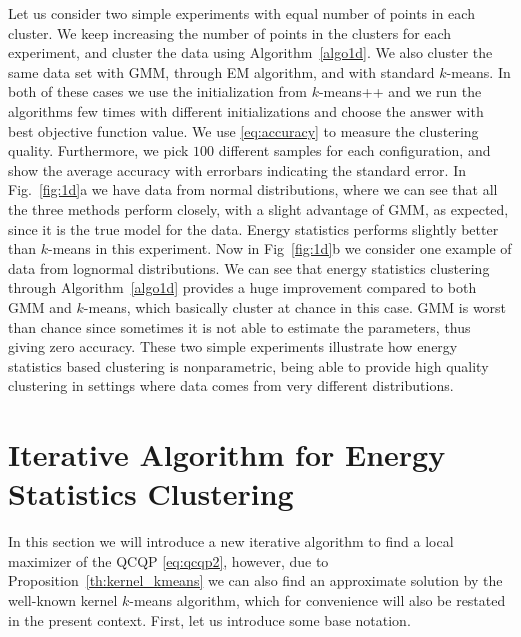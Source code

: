 \documentclass[aps,preprint,nofootinbib,floatfix]{revtex4-1}
\begin{document}
Let us consider two simple experiments with equal number of points
in each cluster. 
We keep increasing the number of points in the clusters for each experiment, 
and cluster the data using Algorithm~\ref{algo1d}. 
We also cluster the same data set
with GMM, through EM algorithm, and with standard $k$-means. In both of these
cases we use the initialization from $k$-means++ \cite{Vassilvitskii} 
and we run the algorithms
few times with different initializations and choose the answer
with best objective function value. We use \eqref{eq:accuracy} to measure
the clustering quality. Furthermore, we pick $100$ different samples
for each configuration, and show the average accuracy with errorbars indicating
the standard error.
In  Fig.~\ref{fig:1d}a 
we have data from normal distributions,
where we can see that all the three methods
perform closely, with a slight advantage of GMM, as expected, since
it is the true model for the data. Energy statistics performs slightly better
than $k$-means in this experiment. Now in Fig~\ref{fig:1d}b
we consider one example of 
data from lognormal distributions. We can see that energy
statistics clustering through Algorithm~\ref{algo1d} provides a huge 
improvement
compared to both GMM and $k$-means, which basically cluster at chance
in this case.
GMM is worst than chance since sometimes it 
is not able to estimate the parameters, thus giving zero
accuracy.
These two simple experiments illustrate
how energy statistics based clustering is nonparametric, being able
to provide high quality clustering in settings where data comes
from very different distributions.




\section{Iterative Algorithm for Energy Statistics Clustering}
\label{sec:algo}

In this section we will introduce a new iterative algorithm to find a local
maximizer of the QCQP \eqref{eq:qcqp2}, however, due to 
Proposition~\ref{th:kernel_kmeans} we can also find an approximate
solution by the well-known kernel $k$-means algorithm, which 
for convenience
will also be restated in the present context.
First, let us introduce some base notation.
\end{document}

